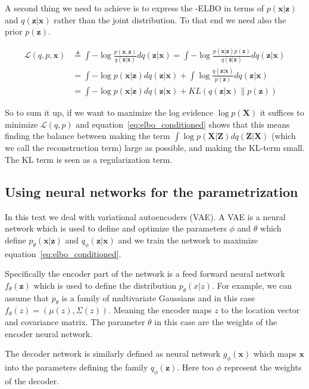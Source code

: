 \documentclass[11pt, a4paper]{report}
\theoremstyle{plain}
\theoremstyle{definition}
\newtheorem{mydef}{Definition}[chapter]
\theoremstyle{remark}
\newcommand{\X}{\mathbf{X}}
\newcommand{\x}{\mathbf{x}}
\newcommand{\Z}{\mathbf{Z}}
\newcommand{\z}{\mathbf{z}}
\begin{document}
A second thing we need to achieve is to express the -ELBO in terms of $p(\x|\z)$
and $q(\z|\x)$ rather than the joint distribution. To that end we need also the
prior $p(\z)$.

\begin{equation}
\begin{aligned}
\mathcal{L}(q,p,\x) &\triangleq \int -\log \frac{p(\x,\z)}{q(\z|\x)}dq(\z|\x) 
= \int -\log \frac{p(\x |\z) p(\z)}{q(\z|\x)}dq(\z|\x) \\
&= \int -\log p(\x | \z)dq(\z|\x) + \int \log \frac{q(\z|\x)}{p(\z)}dq(\z|\x) \\
&= \int -\log p(\x | \z)dq(\z|\x) + KL(q(\z|\x) \| p(\z))
\label{eq:elbo_conditioned}
\end{aligned}
\end{equation}

So to sum it up, if we want to maximize the log evidence $\log p(\X)$ it
suffices to minimize $\mathcal{L}(q,p)$ and equation~\ref{eq:elbo_conditioned}
shows that this means finding the balance between making 
the term $\int \log p(\X | \Z)dq(\Z|\X)$ (which we call the reconstruction term) large as possible, 
and making the KL-term small.
The KL term is seen as a regularization term.

\subsection{Using neural networks for the parametrization}
In this text we deal with variational autoencoders (VAE).
A VAE is a neural network which is used to define and optimize the parameters
$\phi$ and $\theta$ which define $p_{\theta}(\x | \z)$ and $q_{\phi}(\z | \x)$
and we train the network to maximize equation~\ref{eq:elbo_conditioned}.

Specifically the encoder part of the network is a feed forward neural network 
$f_{\theta}(\z)$ which is
used to define the distribution $p_{\theta}(x|z)$. For example, we can assume that $p_{\theta}$
is a family of multivariate Gaussians and in this case $f_{\theta}(z) =
(\mu(z), \Sigma(z))$. Meaning the encoder maps $z$ to the location vector and
covariance matrix. The parameter $\theta$ in this case are the weights of the
encoder neural network. 

The decoder network is similarly defined as neural network $g_{\phi}(\x)$ which
maps $\x$ into the parameters defining the family $q_{\phi}(\z)$. Here too $\phi$
represent the weights of the decoder.
\end{document}
